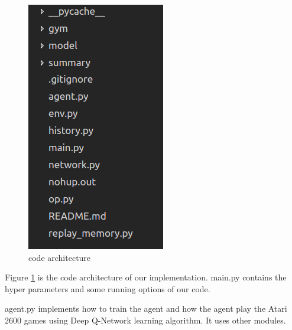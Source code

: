 \documentclass[10pt,twocolumn,letterpaper]{article}
\begin{document}
\begin{CJK}{UTF8}{gbsn}
\begin{figure}
\begin{center}
   \includegraphics[width=0.9\linewidth]{code_architecture.png}
\end{center}
\caption{code architecture}
\label{fig:code_architecture}
\end{figure}

Figure \ref{fig:code_architecture} is the code architecture of our implementation. main.py contains the hyper parameters and some running options of our code. 

agent.py implements how to train the agent and how the agent play the Atari 2600 games using Deep Q-Network learning algorithm. It uses other modules. 


\end{CJK}
\end{document}
